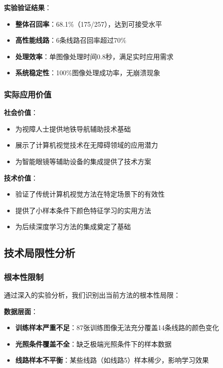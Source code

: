 \documentclass[12pt,a4paper]{article}
\begin{document}
\textbf{实验验证结果}：
\begin{itemize}
    \item \textbf{整体召回率}：68.1\%（175/257），达到可接受水平
    \item \textbf{高性能线路}：6条线路召回率超过70\%
    \item \textbf{处理效率}：单图像处理时间0.8秒，满足实时应用需求
    \item \textbf{系统稳定性}：100\%图像处理成功率，无崩溃现象
\end{itemize}

\subsubsection{实际应用价值}

\textbf{社会价值}：
\begin{itemize}
    \item 为视障人士提供地铁导航辅助技术基础
    \item 展示了计算机视觉技术在无障碍领域的应用潜力
    \item 为智能眼镜等辅助设备的集成提供了技术方案
\end{itemize}

\textbf{技术价值}：
\begin{itemize}
    \item 验证了传统计算机视觉方法在特定场景下的有效性
    \item 提供了小样本条件下颜色特征学习的实用方法
    \item 为后续深度学习方法的集成奠定了基础
\end{itemize}

\subsection{技术局限性分析}

\subsubsection{根本性限制}

通过深入的实验分析，我们识别出当前方法的根本性局限：

\textbf{数据层面}：
\begin{itemize}
    \item \textbf{训练样本严重不足}：87张训练图像无法充分覆盖14条线路的颜色变化
    \item \textbf{光照条件覆盖不全}：缺乏极端光照条件下的样本数据
    \item \textbf{线路样本不平衡}：某些线路（如线路5）样本稀少，影响学习效果
\end{itemize}
\end{document}
